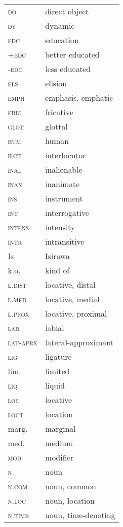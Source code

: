 \begin{tabularx}{.45\textwidth}{lX} 
\textsc{do} & direct object\\
\textsc{dy} & dynamic\\
\textsc{edc} & education\\
\textsc{+edc} & better educated\\
\textsc{-edc} & less educated\\
\textsc{els} & {elision}\\
\textsc{emph} & emphasis, emphatic\\
\textsc{fric} & fricative\\
\textsc{glot} & glottal\\
\textsc{hum} & human\\
\textsc{ilct} & interlocutor\\
\textsc{inal} & inalienable\\
\textsc{inan} & inanimate\\
\textsc{ins} & instrument\\
\textsc{int} & {interrogative}\\
\textsc{intens} & {intensity}\\
\textsc{intr} & intransitive\\
Is & {Isirawa}\\
k.o. & kind of\\
\textsc{l.dist} & {locative}, distal\\
\textsc{l.med} & {locative}, medial\\
\textsc{l.prox} & {locative}, proximal\\
\textsc{lab} & labial\\
\textsc{lat-aprx} & lateral-approximant\\
\textsc{lig} & ligature\\
lim. & limited\\
\textsc{liq} & liquid\\
\textsc{loc} & {locative}\\
\textsc{loct} & location\\
marg. & marginal\\
med. & medium\\
\textsc{mod} & modifier\\
\textsc{n} & {noun}\\
\textsc{n.com} & {noun}, common\\
\textsc{n.loc} & {noun}, location\\
\textsc{n.time} & {noun}, time-denoting\\
\end{tabularx}
 

